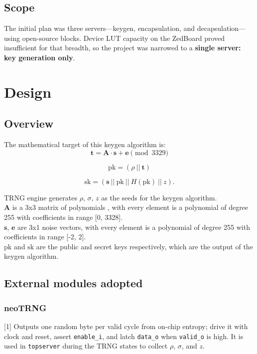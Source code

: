 \documentclass[11pt,a4paper]{article}
\begin{document}
\subsection{Scope}
The initial plan was three servers---keygen, encapsulation, and decapsulation---using open-source blocks. Device LUT capacity on the ZedBoard proved insufficient for that breadth, so the project was narrowed to a \textbf{single server: key generation only}.

\section{Design}

\subsection{Overview}
The mathematical target of this keygen algorithm is:
\[
  \mathbf{t} = \mathbf{A} \cdot \mathbf{s} + \mathbf{e} \pmod{3329}
\]

\[
  \mathrm{pk} = (\rho \ || \ \mathbf{t})
\]

\[
  \mathrm{sk} = (\mathbf{s} \ || \ \mathrm{pk} \ || \ H(\mathrm{pk}) \ || \ z).
\]

\noindent TRNG engine generates $\rho$, $\sigma$, $z$ as the seeds for the keygen algorithm. \\
$\mathbf{A}$ is a 3x3 matrix of polynomials , with every element is a polynomial of degree 255 with coefficients in range [0, 3328]. \\
$\mathbf{s}$, $\mathbf{e}$ are 3x1 noise vectors, with every element is a polynomial of degree 255 with coefficients in range [-2, 2]. \\
$\mathrm{pk}$ and $\mathrm{sk}$ are the public and secret keys respectively, which are the output of the keygen algorithm.

\subsection{External modules adopted}
\subsubsection{neoTRNG}
[1] Outputs one random byte per valid cycle from on-chip entropy; drive it with clock and reset, assert \texttt{enable\_i}, and latch \texttt{data\_o} when \texttt{valid\_o} is high.
It is used in \texttt{topserver} during the TRNG states to collect $\rho$, $\sigma$, and $z$.
\end{document}
